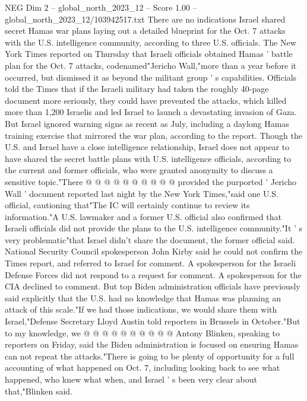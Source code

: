 \begin{textsample}{NEG Dim 2 – global\_north\_2023\_12 – Score 1.00 – global\_north\_2023\_12/103942517.txt}  \label{ex:f2_neg_331}
There are no indications Israel shared secret Hamas war plans laying out a detailed blueprint for the Oct. 7 attacks with the U.S. intelligence community, according to three U.S. officials.
The New York Times reported on Thursday that Israeli officials obtained Hamas ' battle plan for the Oct. 7 attacks, codenamed"Jericho Wall,"more than a year before it occurred, but dismissed it as beyond the militant group ' s capabilities.
Officials told the Times that if the Israeli military had taken the roughly 40-page document more seriously, they could have prevented the attacks, which killed more than 1,200 Israelis and led Israel to launch a devastating invasion of Gaza.
But Israel ignored warning signs as recent as July, including a daylong Hamas training exercise that mirrored the war plan, according to the report.
Though the U.S. and Israel have a close intelligence relationship, Israel does not appear to have shared the secret battle plans with U.S. intelligence officials, according to the current and former officials, who were granted anonymity to discuss a sensitive topic."There @ @ @ @ @ @ @ @ @ @ provided the purported ' Jericho Wall ' document reported last night by the New York Times,"said one U.S. official, cautioning that"The IC will certainly continue to review its information."A U.S. lawmaker and a former U.S. official also confirmed that Israeli officials did not provide the plans to the U.S. intelligence community."It ' s very problematic"that Israel didn't share the document, the former official said.
National Security Council spokesperson John Kirby said he could not confirm the Times report, and referred to Israel for comment.
A spokesperson for the Israeli Defense Forces did not respond to a request for comment.
A spokesperson for the CIA declined to comment.
But top Biden administration officials have previously said explicitly that the U.S. had no knowledge that Hamas was planning an attack of this scale."If we had those indications, we would share them with Israel,"Defense Secretary Lloyd Austin told reporters in Brussels in October."But to my knowledge, we @ @ @ @ @ @ @ @ @ @ Antony Blinken, speaking to reporters on Friday, said the Biden administration is focused on ensuring Hamas can not repeat the attacks."There is going to be plenty of opportunity for a full accounting of what happened on Oct. 7, including looking back to see what happened, who knew what when, and Israel ' s been very clear about that,"Blinken said.

\end{textsample}
